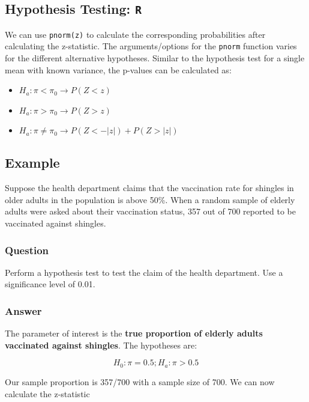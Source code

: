\documentclass[
  letterpaper,
  DIV=11,
  numbers=noendperiod]{scrartcl}
\providecommand{\tightlist}{%
  \setlength{\itemsep}{0pt}\setlength{\parskip}{0pt}}
\begin{document}
\subsection{\texorpdfstring{Hypothesis Testing:
\texttt{R}}{Hypothesis Testing: R}}\label{hypothesis-testing-r-1}

We can use \texttt{pnorm(z)} to calculate the corresponding
probabilities after calculating the z-statistic. The arguments/options
for the \texttt{pnorm} function varies for the different alternative
hypotheses. Similar to the hypothesis test for a single mean with known
variance, the p-values can be calculated as:

\begin{itemize}
\tightlist
\item
  \(H_a: \pi < \pi_0 \to P(Z < z)\)
\item
  \(H_a: \pi > \pi_0 \to P(Z > z)\)
\item
  \(H_a: \pi \neq \pi_0 \to P(Z < -|z|) + P(Z>|z|)\)
\end{itemize}

\subsection{Example}\label{example-7}

Suppose the health department claims that the vaccination rate for
shingles in older adults in the population is above 50\%. When a random
sample of elderly adults were asked about their vaccination status, 357
out of 700 reported to be vaccinated against shingles.

\subsubsection{Question}

Perform a hypothesis test to test the claim of the health department.
Use a significance level of 0.01.

\subsubsection{Answer}

The parameter of interest is the \textbf{true proportion of elderly
adults vaccinated against shingles}. The hypotheses are:

\[
H_0: \pi = 0.5; H_a: \pi > 0.5
\]

Our sample proportion is 357/700 with a sample size of 700. We can now
calculate the z-statistic
\end{document}
